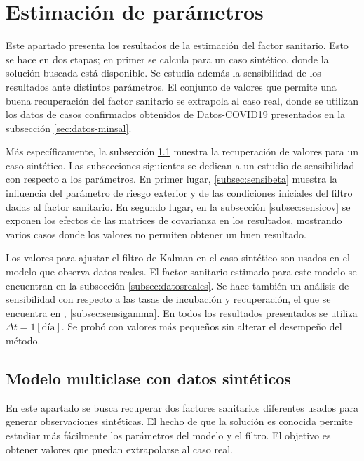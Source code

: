 \section{Estimación de parámetros}\label{sec:estimacion-results}

Este apartado presenta los resultados de la estimación del factor sanitario. Esto se hace en dos etapas; en primer se calcula para un caso sintético, donde la solución buscada está disponible. Se estudia además la sensibilidad de los resultados ante distintos parámetros. El conjunto de valores que permite una buena recuperación del factor sanitario se extrapola al caso real, donde se utilizan los datos de casos confirmados obtenidos de Datos-COVID19 presentados en la subsección \ref{sec:datos-minsal}. 

Más específicamente, la subsección \ref{subsec:sintetico} muestra la recuperación de valores para un caso sintético. Las subsecciones siguientes se dedican a un estudio de sensibilidad con respecto a los parámetros. En primer lugar, \ref{subsec:sensibeta} muestra la influencia del parámetro de riesgo exterior y de las condiciones iniciales del filtro dadas al factor sanitario. En segundo lugar, en la subsección \ref{subsec:sensicov} se exponen los efectos de las matrices de covarianza en los resultados, mostrando varios casos donde los valores no permiten obtener un buen resultado. 

Los valores para ajustar el filtro de Kalman en el caso sintético son usados en el modelo que observa datos reales. El factor sanitario estimado para este modelo se encuentran en la subsección \ref{subsec:datosreales}. Se hace también un análisis de sensibilidad con respecto a las tasas de incubación y recuperación, el que se encuentra en , \ref{subsec:sensigamma}. En todos los resultados presentados se utiliza \(\Delta t = 1 [\text{día}]\). Se probó con valores más pequeños sin alterar el desempeño del método.

\subsection{Modelo multiclase con datos sintéticos} \label{subsec:sintetico}

En este apartado se busca recuperar dos factores sanitarios diferentes usados para generar observaciones sintéticas. El hecho de que la solución es conocida permite estudiar más fácilmente los parámetros del modelo y el filtro. El objetivo es obtener valores que puedan extrapolarse al caso real.

